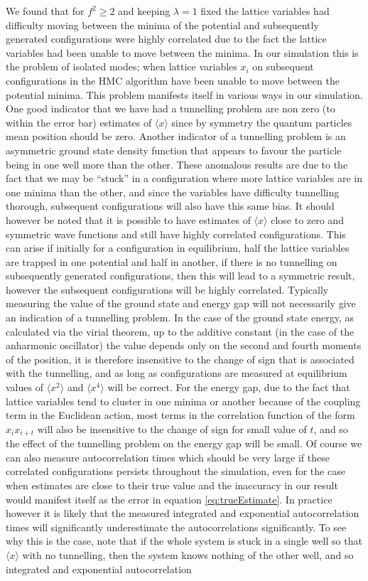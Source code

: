 \documentclass[12pt]{article}
\begin{document}
    We found that for $f^2\geq2$ and keeping $\lambda =1 $ fixed the lattice variables had difficulty moving between the minima of the potential and subsequently generated configurations were highly correlated due to the fact the lattice variables had been unable to move between the minima. In our simulation this is the problem of isolated modes; when lattice variables $x_i$ on subsequent configurations in the HMC algorithm have been unable to move between the potential minima. This problem manifests itself in various ways in our simulation. One good indicator that we have had a tunnelling problem are non zero (to within the error bar) estimates of $\langle x \rangle$ since by symmetry the quantum particles mean position should be zero. Another indicator of a tunnelling problem is an asymmetric ground state density function that appears to favour the particle being in one well more than the other. These anomalous results are due to the fact that we may be ``stuck'' in a configuration where more lattice variables are in one minima than the other, and since the variables have difficulty tunnelling thorough, subsequent configurations will also have this same bias. It should however be noted that it is possible to have estimates of $\langle x \rangle$ close to zero and symmetric wave functions and still have highly correlated configurations. This can arise if initially for a configuration in equilibrium, half the lattice variables are trapped in one potential and half in another, if there is no tunnelling on subsequently generated configurations, then this will lead to a symmetric result, however the subsequent configurations will be highly correlated. Typically measuring the value of the ground state and energy gap will not necessarily give an indication of a tunnelling problem. In the case of the ground state energy, as calculated via the virial theorem, up to the additive constant (in the case of the anharmonic oscillator) the value depends only on the second and fourth moments of the position, it is therefore insensitive to the change of sign that is associated with the tunnelling, and as long as configurations are measured at equilibrium values of $\langle x^2 \rangle$ and $\langle x^4 \rangle$ will be correct. For the energy gap, due to the fact that lattice variables tend to cluster in one minima or another because of the coupling term in the Euclidean action, most terms in the correlation function of the form $x_ix_{i+t}$ will also be insensitive to the change of sign for small value of $t$, and so the effect of the tunnelling problem on the energy gap will be small. Of course we can also measure autocorrelation times which should be very large if these correlated configurations persists throughout the simulation, even for the case when estimates are close to their true value and the inaccuracy in our result would manifest itself as the error in equation \ref{eq:trueEstimate}. In practice however it is likely that the measured integrated and exponential autocorrelation times will significantly underestimate the autocorrelations significantly. To see why this is the case, note that if the whole system is stuck in a single well so that $\langle x \rangle$ with no tunnelling, then the system knows nothing of the other well, and so integrated and exponential autocorrelation 
\end{document}
